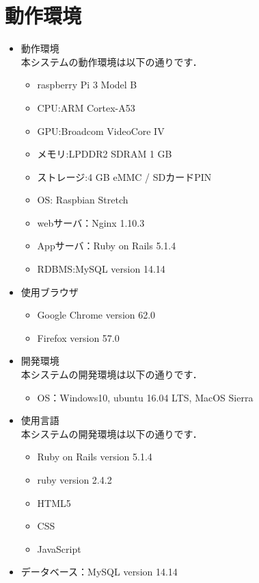 \section{動作環境}

\begin{itemize}

\item 動作環境\\
本システムの動作環境は以下の通りです．
\begin{itemize}
\item raspberry Pi 3 Model B
\item CPU:ARM Cortex-A53
\item GPU:Broadcom VideoCore IV
\item メモリ:LPDDR2 SDRAM 1 GB
\item ストレージ:4 GB eMMC / SDカードPIN
\item OS: Raspbian Stretch
\item webサーバ：Nginx 1.10.3
\item Appサーバ：Ruby on Rails 5.1.4
\item RDBMS:MySQL version 14.14
\end{itemize}

\item 使用ブラウザ
  \begin{itemize}
  \item Google Chrome version 62.0
  \item Firefox version 57.0
  \end{itemize}

\item 開発環境\\
本システムの開発環境は以下の通りです．
  \begin{itemize}
  \item OS：Windows10, ubuntu 16.04 LTS, MacOS Sierra
  \end{itemize}

\item 使用言語\\
本システムの開発環境は以下の通りです．
\begin{itemize}
\item Ruby on Rails version 5.1.4
\item ruby version 2.4.2
\item HTML5
\item CSS
\item JavaScript
\end{itemize}

\item データベース：MySQL version 14.14


\end{itemize}
